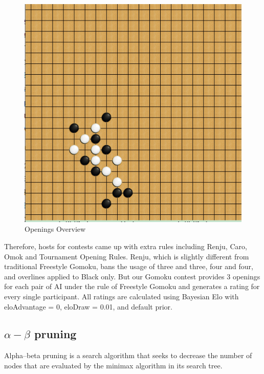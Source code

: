 \documentclass[a4paper, 11pt]{article} %
\begin{document}
\begin{multicols}{2}
\begin{figure}[H]
{    	}\quad
    	\parbox{0.25\linewidth}{
    		\includegraphics[width=\linewidth]{opening3.png}
    	}
    	\caption{Openings Overview}
    \end{figure}
    
    Therefore, hosts for contests came up with extra rules including Renju, Caro, Omok and Tournament Opening Rules. Renju, which is slightly different from traditional Freestyle Gomoku, bans the usage of three and three, four and four, and overlines applied to Black only. But our Gomoku contest provides 3 openings for each pair of AI under the rule of Freestyle Gomoku and generates a rating for every single participant. All ratings are calculated using Bayesian Elo with eloAdvantage =
    0, eloDraw = 0.01, and default prior.
    \subsection{$\alpha-\beta$ pruning}
    Alpha–beta pruning is a search algorithm that seeks to decrease the number of nodes that are evaluated by the minimax algorithm in its search tree.
    

\end{multicols}
\end{document}
